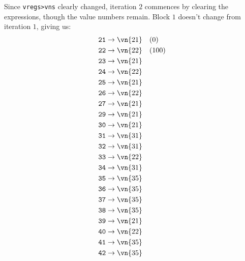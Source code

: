 Since \Verb|vregs>vns| clearly changed, iteration $2$ commences by clearing
the expressions, though the value numbers remain.  Block $1$ doesn't change
from iteration $1$, giving us:
%
\begin{align*}
  \texttt{21} &\to \vn{21} \quad (0)                 \\
  \texttt{22} &\to \vn{22} \quad (100)               \\
  \texttt{23} &\to \vn{21}                           \\
  \texttt{24} &\to \vn{22}                           \\
  \texttt{25} &\to \vn{21}                           \\
  \texttt{26} &\to \vn{22}                           \\
  \texttt{27} &\to \vn{21}                           \\
  \texttt{29} &\to \vn{21}                           \\
  \texttt{30} &\to \vn{21}                           \\
  \texttt{31} &\to \vn{31}                           \\
  \texttt{32} &\to \vn{31}                           \\
  \texttt{33} &\to \vn{22}                           \\
  \texttt{34} &\to \vn{31}                           \\
  \texttt{35} &\to \vn{35}                           \\
  \texttt{36} &\to \vn{35}                           \\
  \texttt{37} &\to \vn{35}                           \\
  \texttt{38} &\to \vn{35}                           \\
  \texttt{39} &\to \vn{21}                           \\
  \texttt{40} &\to \vn{22}                           \\
  \texttt{41} &\to \vn{35}                           \\
  \texttt{42} &\to \vn{35}
\end{align*}

